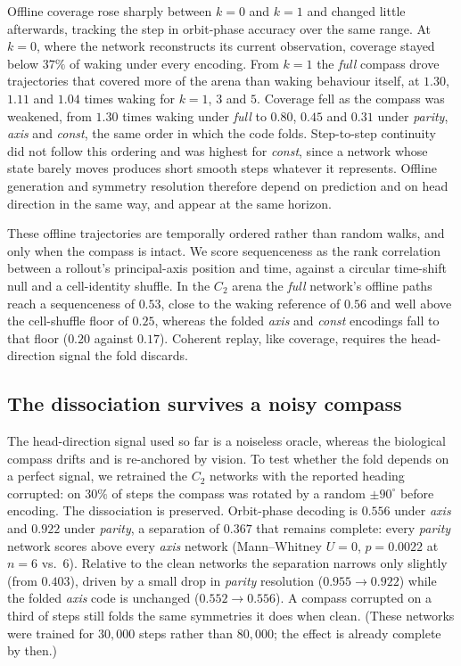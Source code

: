 \documentclass[9pt,lineno]{elife}
\begin{document}
Offline coverage rose sharply between $k=0$ and $k=1$ and changed little afterwards, tracking
the step in orbit-phase accuracy over the same range. At $k=0$, where the network reconstructs
its current observation, coverage stayed below $37\%$ of waking under every encoding. From
$k=1$ the \textit{full} compass drove trajectories that covered more of the arena than waking
behaviour itself, at $1.30$, $1.11$ and $1.04$ times waking for $k=1$, $3$ and $5$. Coverage
fell as the compass was weakened, from $1.30$ times waking under \textit{full} to $0.80$,
$0.45$ and $0.31$ under \textit{parity}, \textit{axis} and \textit{const}, the same order in
which the code folds. Step-to-step continuity did not follow this ordering and was highest for
\textit{const}, since a network whose state barely moves produces short smooth steps whatever
it represents. Offline generation and symmetry resolution therefore depend on prediction and on
head direction in the same way, and appear at the same horizon.

These offline trajectories are temporally ordered rather than random walks, and only when the
compass is intact. We score sequenceness as the rank correlation between a rollout's
principal-axis position and time, against a circular time-shift null and a cell-identity
shuffle. In the $C_2$ arena the \textit{full} network's offline paths reach a sequenceness of
$0.53$, close to the waking reference of $0.56$ and well above the cell-shuffle floor of $0.25$,
whereas the folded \textit{axis} and \textit{const} encodings fall to that floor ($0.20$ against
$0.17$). Coherent replay, like coverage, requires the head-direction signal the fold discards.

\subsection{The dissociation survives a noisy compass}

The head-direction signal used so far is a noiseless oracle, whereas the biological compass
drifts and is re-anchored by vision. To test whether the fold depends on a perfect signal, we
retrained the $C_2$ networks with the reported heading corrupted: on $30\%$ of steps the compass
was rotated by a random $\pm 90^\circ$ before encoding. The dissociation is preserved. Orbit-phase
decoding is $0.556$ under \textit{axis} and $0.922$ under \textit{parity}, a separation of
$0.367$ that remains complete: every \textit{parity} network scores above every \textit{axis}
network (Mann--Whitney $U = 0$, $p = 0.0022$ at $n = 6$ vs.\ $6$). Relative to the clean
networks the separation narrows only slightly (from $0.403$), driven by a small drop in
\textit{parity} resolution ($0.955 \to 0.922$) while the folded \textit{axis} code is unchanged
($0.552 \to 0.556$). A compass corrupted on a third of steps still folds the same symmetries
it does when clean. (These networks were trained for $30{,}000$ steps rather than
$80{,}000$; the effect is already complete by then.)
\end{document}
